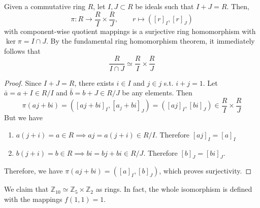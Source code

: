   \begin{corollary}
    Given a commutative ring $R$, let $I, J \subset R$ be ideals such that $I + J = R$. Then, 
    \begin{equation}
      \pi: R \to \frac{R}{I} \times \frac{R}{J}, \qquad r \mapsto ([r]_I, [r]_J)
    \end{equation}
    with component-wise quotient mappings is a surjective ring homomorphism with $\ker{\pi} = I \cap J$. By the fundamental ring homomorphism theorem, it immediately follows that 
    \begin{equation}
      \frac{R}{I \cap J} \simeq \frac{R}{I} \times \frac{R}{J}
    \end{equation}
  \end{corollary}
  \begin{proof}
    Since $I + J = R$, there exists $i \in I$ and $j \in j$ s.t. $i + j = 1$. Let $\bar{a} = a + I \in R/I$ and $\bar{b} = b + J \in R/J$ be any elements. Then 
    \begin{equation}
      \pi(aj + bi) = ([aj + bi]_I, [a_j + bi]_J) = ([aj]_I, [bi]_J) \in \frac{R}{I} \times \frac{R}{J}
    \end{equation} 
    But we have 
    \begin{enumerate}
      \item $a(j + i) = a \in R \implies aj = a(j + i) \in R/I$. Therefore $[aj]_I = [a]_I$ 
      \item $b(j + i) = b \in R \implies bi = bj + bi \in R/J$. Therefore $[b]_J = [bi]_J$. 
    \end{enumerate}
    Therefore, we have $\pi(aj + bi) = ([a]_I, [b]_J)$, which proves surjectivity. 
  \end{proof} 

  \begin{example}
    We claim that $\mathbb{Z}_{10} \simeq \mathbb{Z}_5 \times \mathbb{Z}_2$ as rings. In fact, the whole isomorphism is defined with the mappings $f(1, 1) = 1$. 
  \end{example}

